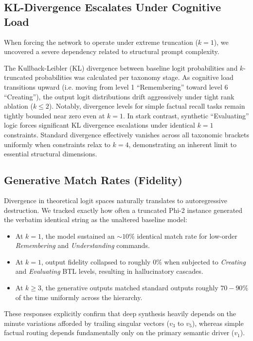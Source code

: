 \documentclass{article}
\begin{document}
\subsection{KL-Divergence Escalates Under Cognitive Load}

When forcing the network to operate under extreme truncation ($k=1$), we uncovered a severe dependency related to structural prompt complexity. 

The Kullback-Leibler (KL) divergence between baseline logit probabilities and $k$-truncated probabilities was calculated per taxonomy stage. 
As cognitive load transitions upward (i.e. moving from level 1 ``Remembering'' toward level 6 ``Creating''), the output logit distributions drift aggressively under tight rank ablation ($k \le 2$). Notably, divergence levels for simple factual recall tasks remain tightly bounded near zero even at $k=1$. In stark contrast, synthetic ``Evaluating'' logic forces significant KL divergence escalations under identical $k=1$ constraints. Standard divergence effectively vanishes across all taxonomic brackets uniformly when constraints relax to $k=4$, demonstrating an inherent limit to essential structural dimensions.

\subsection{Generative Match Rates (Fidelity)}

Divergence in theoretical logit spaces naturally translates to autoregressive destruction. We tracked exactly how often a truncated Phi-2 instance generated the verbatim identical string as the unaltered baseline model:

\begin{itemize}
    \item At $k=1$, the model sustained an $\sim10\%$ identical match rate for low-order \textit{Remembering} and \textit{Understanding} commands.
    \item At $k=1$, output fidelity collapsed to roughly $0\%$ when subjected to \textit{Creating} and \textit{Evaluating} BTL levels, resulting in hallucinatory cascades.
    \item At $k \ge 3$, the generative outputs matched standard outputs roughly $70-90\%$ of the time uniformly across the hierarchy.
\end{itemize}

These responses explicitly confirm that deep synthesis heavily depends on the minute variations afforded by trailing singular vectors ($v_3$ to $v_5$), whereas simple factual routing depends fundamentally only on the primary semantic driver ($v_1$).
\end{document}
